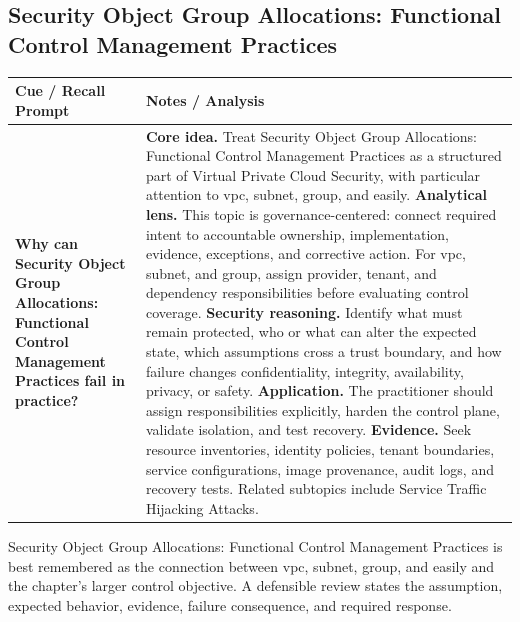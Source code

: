 \documentclass[11pt]{article}
\newcommand{\CornellHeader}{%
\rowcolor{Navy}\color{white}\bfseries Cue / Recall Prompt & \color{white}\bfseries Notes / Analysis\\\hline}
\newcommand{\CornellRow}[2]{%
\cellcolor{CueGray}\RaggedRight\textbf{#1} & \RaggedRight #2\\\hline}
\begin{document}
\subsection*{Security Object Group Allocations: Functional Control Management Practices}
\begin{longtable}{>{\RaggedRight\arraybackslash}p{}|>{\RaggedRight\arraybackslash}p{}}
\CornellHeader
\CornellRow{Why can Security Object Group Allocations: Functional Control Management Practices fail in practice?}{\textbf{Core idea.} Treat Security Object Group Allocations: Functional Control Management Practices as a structured part of Virtual Private Cloud Security, with particular attention to vpc, subnet, group, and easily. \textbf{Analytical lens.} This topic is governance-centered: connect required intent to accountable ownership, implementation, evidence, exceptions, and corrective action. For vpc, subnet, and group, assign provider, tenant, and dependency responsibilities before evaluating control coverage. \textbf{Security reasoning.} Identify what must remain protected, who or what can alter the expected state, which assumptions cross a trust boundary, and how failure changes confidentiality, integrity, availability, privacy, or safety. \textbf{Application.} The practitioner should assign responsibilities explicitly, harden the control plane, validate isolation, and test recovery. \textbf{Evidence.} Seek resource inventories, identity policies, tenant boundaries, service configurations, image provenance, audit logs, and recovery tests. Related subtopics include Service Traffic Hijacking Attacks.}
\end{longtable}
\begin{topicsummary}
Security Object Group Allocations: Functional Control Management Practices is best remembered as the connection between vpc, subnet, group, and easily and the chapter's larger control objective. A defensible review states the assumption, expected behavior, evidence, failure consequence, and required response.
\end{topicsummary}
\end{document}
